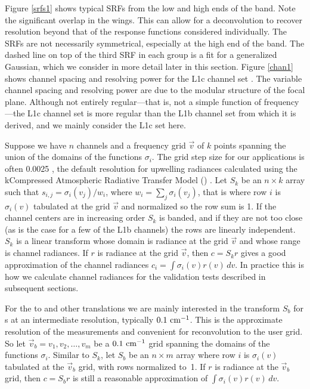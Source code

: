 \documentclass[10pt,twocolumn]{article}
\begin{document}
Figure \ref{srfs1} shows typical {\airs} SRFs from the low and high
ends of the band.  Note the significant overlap in the wings.  This
can allow for a deconvolution to recover resolution beyond that of
the response functions considered individually.  The SRFs are not
necessarily symmetrical, especially at the high end of the band.
The dashed line on top of the third SRF in each group is a fit for a
generalized Gaussian, which we consider in more detail later in this
section.  Figure \ref{chan1} shows channel spacing and resolving
power for the {\airs} L1c channel set \cite{a1c:atbd}.  The variable
channel spacing and resolving power are due to the modular structure
of the focal plane.  Although not entirely regular---that is, not a
simple function of frequency---the L1c channel set is more regular
than the L1b channel set from which it is derived, and we mainly
consider the L1c set here.

Suppose we have $n$ channels and a frequency grid $\vec v$ of $k$
points spanning the union of the domains of the functions
$\sigma_i$.  The grid step size for our applications is often 0.0025
{\wn}, the default resolution for upwelling radiances calculated
using the kCompressed Atmospheric Radiative Transfer Model (\kcarta)
\cite{kcarta1}.  Let $S_k$ be an $n\times k$ array such that
$s_{i,j} = \sigma_i(v_j)/w_i$, where $w_i = \sum_j \sigma_i(v_j)$,
that is where row $i$ is $\sigma_i(v)$ tabulated at the grid $\vec
v$ and normalized so the row sum is 1.  If the channel centers are
in increasing order $S_k$ is banded, and if they are not too close
(as is the case for a few of the L1b channels) the rows are linearly
independent.  $S_k$ is a linear transform whose domain is radiance
at the grid $\vec v$ and whose range is channel radiances.  If $r$
is radiance at the grid $\vec v$, then $c = S_k r$ gives a good
approximation of the channel radiances $c_i =
\int\sigma_i(v)r(v)\,dv$.  In practice this is how we calculate
{\airs} channel radiances for the validation tests described in
subsequent sections.


For the {\airs} to {\cris} and other translations we are mainly
interested in the transform $S_b$ for {\srf}s at an intermediate
resolution, typically $0.1~\mbox{cm$^{-1}$}$.  This is the approximate resolution
of the {\srf} measurements and convenient for reconvolution to the
{\cris} user grid.  So let $\vec v_b = v_1,v_2,\ldots,v_m$ be a
$0.1~\mbox{cm$^{-1}$}$ grid spanning the domains of the functions $\sigma_i$.
Similar to $S_k$, let $S_b$ be an $n\times m$ array where row $i$ is
$\sigma_i(v)$ tabulated at the $\vec v_b$ grid, with rows normalized
to~1.  If $r$ is radiance at the $\vec v_b$ grid, then $c = S_b r$
is still a reasonable approximation of $\int\sigma_i(v)r(v)\,dv$.
\end{document}
